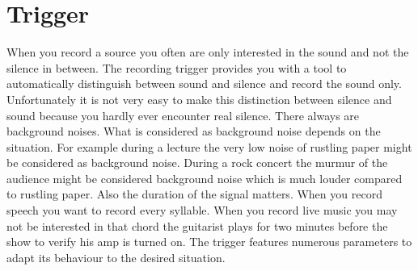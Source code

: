 \section{Trigger}
  When you record a source you often are only interested in the sound and not
  the silence in between. The recording trigger provides you with a
  tool to automatically distinguish between sound and silence and record the
  sound only.  Unfortunately it is not very easy to make this distinction between
  silence and sound because you hardly ever encounter real silence. There always
  are background noises. What is considered as background noise depends on the
  situation. For example during a lecture the very low noise of rustling paper
  might be considered as background noise. During a rock concert the murmur of
  the audience might be considered background noise which is much louder compared
  to rustling paper. Also the duration of the signal matters. When you record
  speech you want to record every syllable. When you record live music you may
  not be interested in that chord the guitarist plays for two minutes before
  the show to verify his amp is turned on. The trigger features numerous
  parameters to adapt its behaviour to the desired situation.
